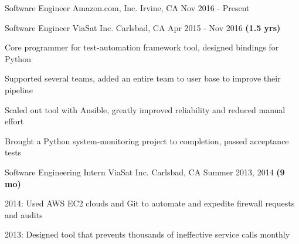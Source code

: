 

\begin{cventries}

  \cventry
    {Software Engineer} %
    {Amazon.com, Inc.} %
    {Irvine, CA} %
    {Nov 2016 - Present \textbf{}} %
    {
    }

  \cventry
    {Software Engineer} %
    {ViaSat Inc.} %
    {Carlsbad, CA} %
    {Apr 2015 - Nov 2016 \textbf{(1.5 yrs)}} %
    {
      \begin{cvitems} %
        \item {Core programmer for test-automation framework tool, designed bindings for Python}
        \item {Supported several teams, added an entire team to user base to improve their pipeline}
        \item {Scaled out tool with Ansible, greatly improved reliability and reduced manual effort}
        \item {Brought a Python system-monitoring project to completion, passed acceptance tests}
      \end{cvitems}
    }

  \cventry
    {Software Engineering Intern} %
    {ViaSat Inc.} %
    {Carlsbad, CA} %
    {Summer 2013, 2014 \textbf{(9 mo)}} %
    {
      \begin{cvitems} %
        \item {2014: Used AWS EC2 clouds and Git to automate and expedite firewall requests and audits}
        \item {2013: Designed tool that prevents thousands of ineffective service calls monthly}
      \end{cvitems}
    }


\end{cventries}
